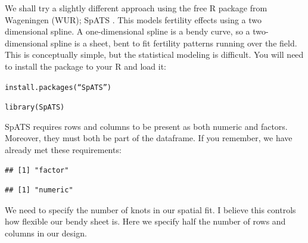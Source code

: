 \documentclass[
]{book}
\newenvironment{Shaded}{\begin{snugshade}}{\end{snugshade}}
\newcommand{\CommentTok}[1]{\textcolor[rgb]{0.56,0.35,0.01}{\textit{#1}}}
\newcommand{\DecValTok}[1]{\textcolor[rgb]{0.00,0.00,0.81}{#1}}
\newcommand{\FunctionTok}[1]{\textcolor[rgb]{0.00,0.00,0.00}{#1}}
\newcommand{\NormalTok}[1]{#1}
\newcommand{\OtherTok}[1]{\textcolor[rgb]{0.56,0.35,0.01}{#1}}
\newcommand{\SpecialCharTok}[1]{\textcolor[rgb]{0.00,0.00,0.00}{#1}}
\begin{document}
We shall try a slightly different approach using the free R package from Wageningen (WUR); SpATS \citep{SpATS2017}. This models fertility effects using a two dimensional spline. A one-dimensional spline is a bendy curve, so a two-dimensional spline is a sheet, bent to fit fertility patterns running over the field. This is conceptually simple, but the statistical modeling is difficult. You will need to install the package to your R and load it:

\texttt{install.packages(“SpATS”)}

\texttt{library(SpATS)}

SpATS requires rows and columns to be present as both numeric and factors. Moreover, they must both be part of the dataframe. If you remember, we have already met these requirements:

\begin{Shaded}
\end{Shaded}

\begin{verbatim}
## [1] "factor"
\end{verbatim}

\begin{Shaded}
\end{Shaded}

\begin{verbatim}
## [1] "numeric"
\end{verbatim}

We need to specify the number of knots in our spatial fit. I believe this controls how flexible our bendy sheet is. Here we specify half the number of rows and columns in our design.

\begin{Shaded}
\end{Shaded}
\end{document}

